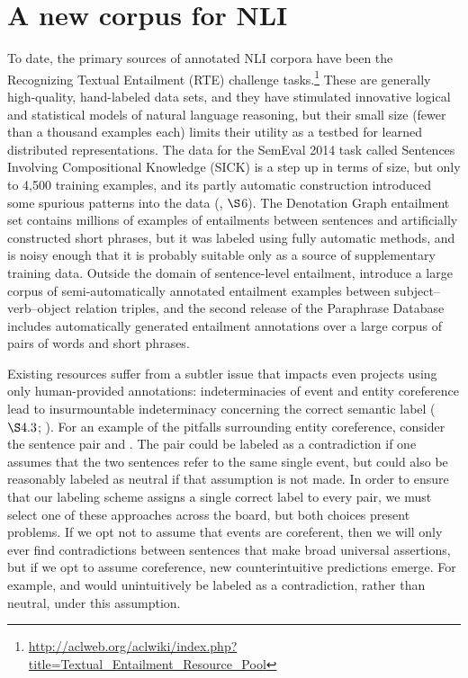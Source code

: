 
\section{A new corpus for NLI}\label{sec:discussion}

To date, the primary sources of annotated NLI corpora have been the
Recognizing Textual Entailment (RTE)
challenge tasks.\footnote{\url{http://aclweb.org/aclwiki/index.php?title=Textual_Entailment_Resource_Pool}}
These are generally high-quality, hand-labeled data sets, and they
have stimulated innovative logical and statistical models of natural
language reasoning, but their small size (fewer than a thousand examples each)
limits their utility as a testbed for learned distributed representations. 
The data for the SemEval 2014 task called Sentences Involving Compositional Knowledge (SICK) is a step up in terms of size, but only to 4,500 training examples, and its
partly automatic construction introduced some spurious patterns into
the data (\citealt{marelli2014semeval}, $\S$6). The
Denotation Graph entailment set \cite{hodoshimage} contains millions of
examples of entailments between sentences and artificially constructed
short phrases, but it was labeled using fully automatic methods, and is
noisy enough that it is probably suitable only as a source of
supplementary training data.
Outside the domain of sentence-level entailment,  introduce
a large corpus of semi-automatically annotated entailment examples 
between subject--verb--object relation triples, and the second release of the 
Paraphrase Database \cite{ganitkevitch2ppdb} includes automatically generated entailment annotations
over a large corpus of pairs of words and short phrases.

Existing resources suffer from a subtler issue that impacts even
projects using only human-provided annotations: indeterminacies of
event and entity coreference lead to insurmountable indeterminacy
concerning the correct semantic label (\citealt{de2008finding} $\S4.3$; \citealt{marelli2014sick}). 
For an example of the pitfalls surrounding entity coreference, consider the sentence pair  and . The pair could be labeled as a contradiction if one assumes that the two sentences refer to the same single event, but could also be reasonably labeled as neutral if that assumption is not made. In order to ensure that our labeling scheme assigns a single correct label to every pair, we must select one of these approaches across the board, but both choices present problems. If we opt not to assume that events are coreferent, then we will only ever find contradictions between sentences that make broad universal assertions, but if we opt to assume coreference, new counterintuitive predictions emerge. For example,  and  would unintuitively be labeled as a contradiction, rather than neutral, under this assumption.

